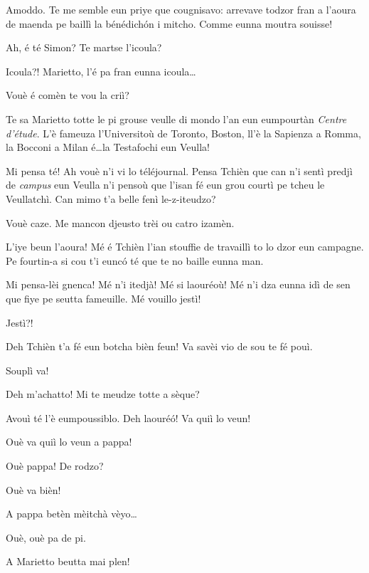 \begin{drama}
\Cienspeaks Amoddo. Te me semble eun priye que cougnisavo: arrevave todzor fran a l’aoura de maenda pe baillì la bénédich\'on i mitcho. Comme eunna moutra souisse!

\Mariettospeaks Ah, é té Simon? Te martse l’icoula?

\Simonspeaks Icoula?! Marietto, l’é pa fran eunna icoula\ldots

\Mariettospeaks Vouè é comèn te vou la criì?

\Simonspeaks Te sa Marietto totte le pi grouse veulle di mondo l’an eun eumpourtàn \textit{Centre d'étude}. L’è fameuza l’Universitoù de Toronto, Boston, ll'è la Sapienza a Romma, la Bocconi a Milan é\ldots la Testafochi eun Veulla!

\Mariettospeaks Mi pensa té! Ah vouè n’i vi lo téléjournal. Pensa Tchièn que can n’i sentì predjì de \textit{campus} eun Veulla n’i pensoù que l’isan fé eun grou courtì pe tcheu le Veullatchì. Can mimo t’a belle fenì le-z-iteudzo?

\Simonspeaks Vouè caze. Me mancon djeusto trèi ou catro izamèn.

\Mariettospeaks L'iye beun l’aoura! Mé é Tchièn l'ian stouffie de travaillì to lo dzor eun campagne. Pe fourtin-a si cou t’i eunc\'o té que te no baille eunna man.

\Simonspeaks Mi pensa-lèi gnenca! Mé n'i itedjà! Mé si laouréoù! Mé n’i dza eunna idì de sen que fiye pe seutta fameuille. Mé vouillo jestì!

\Cienspeaks Jestì?!

\Mariettospeaks Deh Tchièn t’a fé eun botcha bièn feun! Va savèi vio de sou te fé pouì.

\Cienspeaks Souplì va!

\Mariettospeaks Deh m’achatto!  Mi te meudze totte a sèque?

\Cienspeaks Avouì té l’è eumpoussiblo.  Deh laouré\'o! Va quiì lo veun!

\Mariettospeaks Ouè va quiì lo veun a pappa!

\Simonspeaks {} Ouè pappa! De rodzo?

\Mariettospeaks Ouè va bièn!


\Simonspeaks A pappa betèn mèitchà vèyo\ldots

\Cienspeaks Ouè, ouè pa de pi.

\Mariettospeaks A Marietto beutta mai plen!


\end{drama}
